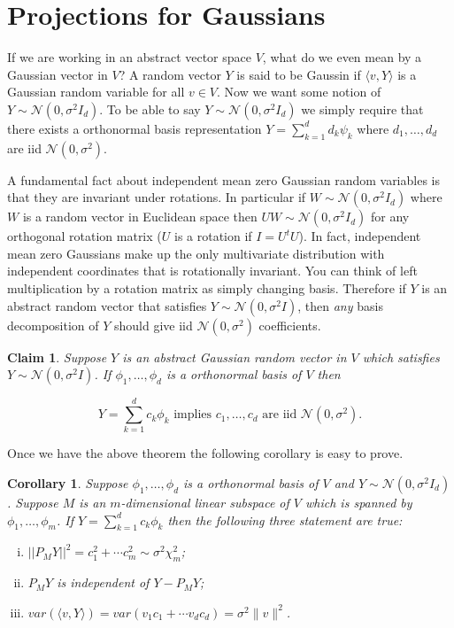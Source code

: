 \documentclass[11pt]{report}
\newtheorem{claim}{Claim}
\newtheorem{corollary}{Corollary}
\begin{document}
\section{Projections for Gaussians}


If we are working in an abstract vector space $V$, what do we even mean by a Gaussian vector in $V$? A random vector $Y$ is said to be Gaussin if $\langle v,Y\rangle$ is a Gaussian random variable for all $v\in V$. Now we want some notion of $Y\sim \mathcal N(0,\sigma^2 I_d)$. To be able to say $Y\sim \mathcal N(0,\sigma^2 I_d)$ we simply require that there exists a orthonormal basis representation $Y= \sum_{k=1}^d d_k \psi_k$ where $d_1,\ldots, d_d$ are iid $\mathcal N(0,\sigma^2)$. 

A fundamental fact about independent mean zero Gaussian random variables is that they are invariant under rotations. In particular if $W \sim \mathcal N\left(0, \sigma^2 I_d\right)$ where $W$ is a random vector in Euclidean space then $UW \sim \mathcal N\left(0, \sigma^2I_d\right)$ for any orthogonal rotation matrix ($U$ is a rotation if  $I = U^{t}U$). In fact, independent mean zero Gaussians make up the only multivariate distribution with independent coordinates that is rotationally invariant. 
You can think of left multiplication by a rotation matrix as simply changing basis. Therefore if  $Y$ is an abstract random vector that satisfies $Y\sim \mathcal N(0,\sigma^2 I)$, then {\em any} basis decomposition of $Y$ should give iid $\mathcal N(0,\sigma^2)$ coefficients. 

\begin{claim}
Suppose $Y$ is an abstract Gaussian random vector in $V$ which satisfies $Y\sim \mathcal N(0,\sigma^2 I)$. If $\phi_1,\ldots, \phi_d$ is a orthonormal basis of $V$ then 
 
 \[ 
 \boxed{Y = \sum_{k=1}^d c_k \phi_k \text{ implies } c_1,\ldots, c_d \text{ are iid $\mathcal N(0,\sigma^2)$.}}
 \]
\end{claim}

Once we have the above theorem the following corollary is easy to prove.

\begin{corollary}
Suppose $\phi_1,\ldots, \phi_d$ is a orthonormal basis of $V$ and $Y\sim \mathcal N(0,\sigma^2 I_d)$. Suppose $M$ is an $m$-dimensional linear subspace of $V$ which is spanned by $\phi_1,\ldots, \phi_m$. If $Y = \sum_{k=1}^d c_k \phi_k$ then the following three statement are true:
\begin{enumerate}[(i)]
\item $||P_MY||^2 = c_1^2+\cdots c_m^2 \sim \sigma^2 \chi^2_m$;
\item $P_MY$ is independent of  $Y-P_MY$;
\item $var(\langle v,Y\rangle) = var( v_1 c_1+\cdots v_dc_d) =  \sigma^2 \| v \|^2$.
\end{enumerate}
\end{corollary}


\end{document}

